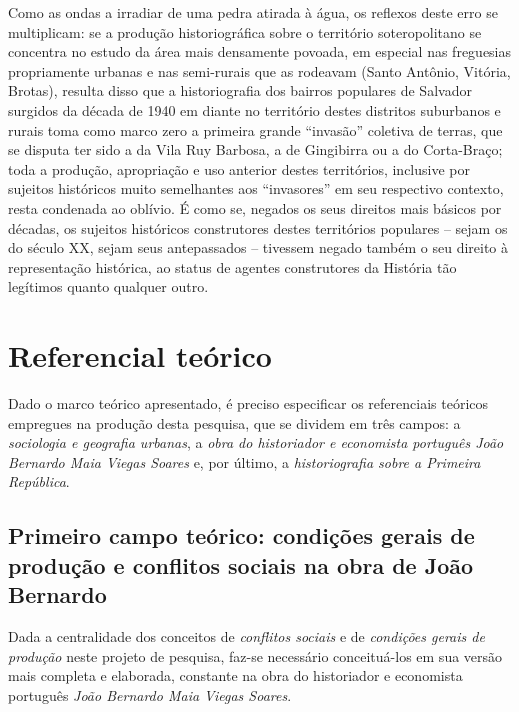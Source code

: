 Como as ondas a irradiar de uma pedra atirada à água, os reflexos deste erro se multiplicam: se a produção historiográfica sobre o território soteropolitano se concentra no estudo da área mais densamente povoada, em especial nas freguesias propriamente urbanas e nas semi-rurais que as rodeavam (Santo Antônio, Vitória, Brotas), resulta disso que a historiografia dos bairros populares de Salvador surgidos da década de 1940 em diante no território destes distritos suburbanos e rurais toma como marco zero a primeira grande ``invasão'' coletiva de terras, que se disputa ter sido a da Vila Ruy Barbosa, a de Gingibirra ou a do Corta-Braço; toda a produção, apropriação e uso anterior destes territórios, inclusive por sujeitos históricos muito semelhantes aos ``invasores'' em seu respectivo contexto, resta condenada ao oblívio. É como se, negados os seus direitos mais básicos por décadas, os sujeitos históricos construtores destes territórios populares -- sejam os do século XX, sejam seus antepassados --  tivessem negado também o seu direito à representação histórica, ao status de agentes construtores da História tão legítimos quanto qualquer outro.

\section{Referencial teórico}
\label{sec:refeteor}

Dado o marco teórico apresentado, é preciso especificar os referenciais teóricos empregues na produção desta pesquisa, que se dividem em três campos: a \textit{sociologia e geografia urbanas}, a \textit{obra do historiador e economista português João Bernardo Maia Viegas Soares} e, por último, a \textit{historiografia sobre a Primeira República}.

\subsection{Primeiro campo teórico: condições gerais de produção e conflitos sociais na obra de João Bernardo}
\label{subsec:cgpcsjobe}

Dada a centralidade dos conceitos de \textit{conflitos sociais} e de \textit{condições gerais de produção} neste projeto de pesquisa, faz-se necessário conceituá-los em sua versão mais completa e elaborada, constante na obra do historiador e economista português \textit{João Bernardo Maia Viegas Soares}. 

